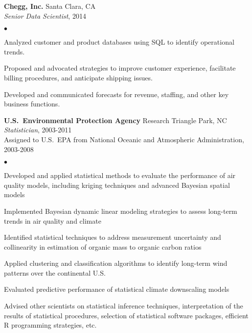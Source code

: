 \documentclass[11pt]{article}
\def\newempl{\vspace*{0.4cm}}
\begin{document}
\newempl
\textbf{Chegg, Inc.}  \hfill Santa Clara, CA\\
\textit{Senior Data Scientist}, 2014 %

\begin{list}{$\bullet$}{
\setlength{\topsep}{0cm}
\setlength{\partopsep}{0cm}
\setlength{\parsep}{0cm}
\setlength{\itemsep}{0cm}
\setlength{\labelsep}{1ex}
\setlength{\labelwidth}{1em}
\setlength{\leftmargin}{1em}
}
\item Analyzed customer and product databases using SQL to identify operational
trends. %
\item Proposed and advocated strategies to improve customer experience,
facilitate billing procedures, and anticipate shipping issues.
\item Developed and communicated forecasts for revenue, staffing, and other key
business functions.
\end{list}



\newempl
\textbf{U.S.\ Environmental Protection Agency}  \hfill Research Triangle Park, NC\\
\textit{Statistician}, 2003-2011\\
Assigned to U.S.~EPA from National Oceanic and Atmospheric Administration,
2003-2008

\begin{list}{$\bullet$}{
\setlength{\topsep}{0cm}
\setlength{\partopsep}{0cm}
\setlength{\parsep}{0cm}
\setlength{\itemsep}{0cm}
\setlength{\labelsep}{1ex}
\setlength{\labelwidth}{1em}
\setlength{\leftmargin}{1em}
}
\item Developed and applied statistical methods to evaluate the performance of air quality models, including kriging techniques and advanced Bayesian spatial models
\item Implemented Bayesian dynamic linear modeling strategies to assess long-term trends in air quality and climate
\item Identified statistical techniques to address measurement uncertainty and collinearity in estimation of organic mass to organic carbon ratios
\item Applied clustering and classification algorithms to identify long-term wind patterns over the continental U.S.
\item Evaluated predictive performance of statistical climate
  downscaling models
\item Advised other scientists on statistical inference techniques,
  interpretation of the results of statistical procedures, selection
  of statistical software packages, efficient R programming strategies, etc.
\end{list}
\end{document}
